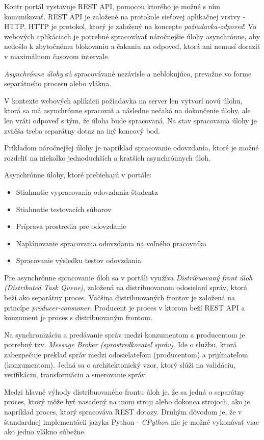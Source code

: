 \documentclass[
  digital, %
  twoside, %
  table,   %
  lof,     %
  lot,     %
]{fithesis3}
\begin{document}
Kontr portál vystavuje REST API, pomocou ktorého je možné s ním komunikovať.
REST API je založené na protokole sieťovej aplikačnej vrstvy - HTTP, HTTP je protokol, ktorý je založený na koncepte \emph{požiadavka-odpoveď}. Vo webových aplikáciach je potrebné spracovávať náročnejšie úlohy asynchrónne, aby nedošlo k zbytočnému blokovaniu a čakaniu na odpoveď, ktorá ani nemusí doraziť v maximálnom časovom intervale. 

\emph{Asynchrónne úlohy} sú spracovávané nezávisle a neblokujúco, prevažne vo forme separátneho procesu alebo vlákna.

V kontexte webových aplikácii požiadavka na server len vytvorí novú úlohu, ktorá sa má asynchrónne spracovať a následne nečaká na dokončenie úlohy, ale len vráti odpoveď s tým, že úloha bude spracovaná. Na stav spracovania úlohy je zväčša treba separátny dotaz na iný koncový bod. 

Príkladom náročnejšej úlohy je napríklad spracovanie odovzdania, ktoré je možné rozdeliť na niekoľko jednoduchších a kratších asynchrónnych úloh.

Asynchrónne úlohy, ktoré prebiehajú v portále:
\begin{itemize}
    \item Stiahnutie vypracovania odovzdania študenta
    \item Stiahnutie testovacích súborov
    \item Príprava prostredia pre odovzdanie
    \item Naplánovanie spracovania odovzdania na voľného pracovníka
    \item Spracovanie výsledku testov odovzdania
\end{itemize}

Pre asynchrónne spracovanie úloh sa v portáli využíva \emph{Distribuovaný front úloh (Distributed Task Queue)}, založená na distribuovanom odosielaní správ, ktorá beží ako separátny proces. Väčšina distribuovaných frontov je založená na princípe \emph{producer-consumer}. Producent je proces v ktorom beží REST API a konzument je proces s distribuovaným frontom. 

Na synchronizáciu a predávanie správ medzi konzumentom a producentom je potrebný tzv. \emph{Message Broker (sprostredkovateľ správ)}. Ide o službu, ktorá zabezpečuje preklad správ medzi odosielateľom (producentom) a prijímateľom (konzumentom). Jedná sa o architektonický vzor, ktorý slúži na validáciu, verifikáciu, transformáciu a smerovanie správ.

Medzi hlavné výhody distribuovaného frontu úloh je, že sa jedná o separátny proces, ktorý môže byť nasadený na inom stroji alebo dokonca strojoch, ako je napríklad proces, ktorý spracováva REST dotazy. Druhým dôvodom je, že v štandardnej implementácii jazyka Python - \emph{CPython} nie je možné vykonávať viac ako jedno vlákno súbežne.
\end{document}
